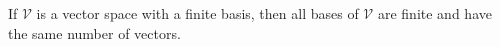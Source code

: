 \begin{proper}
\label{proper:samenvecsbases}
If $\mathcal{V}$ is a vector space with a finite basis, then all bases of $\mathcal{V}$ are finite and have the same number of vectors.
\end{proper}

